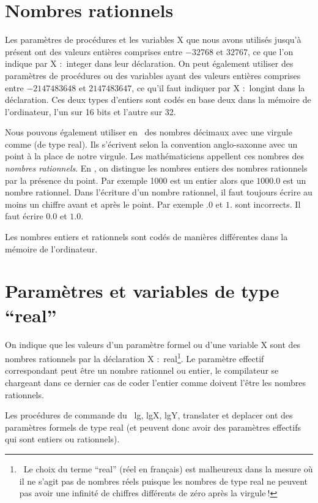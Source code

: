 \section{Nombres rationnels}
Les paramètres de procédures et les variables {\idt X} que nous avons utilisés jusqu'à 
présent ont des valeurs entières comprises entre $-32768$ et $32767$, ce que l'on indique 
par {\idt X $:$ integer} dans leur déclaration. On peut également utiliser des paramètres de 
procédures ou des variables ayant des valeurs entières comprises entre 
$-2 147 483 648$ et $2 147 483 647$, ce qu'il faut indiquer par {\idt X $:$ longint} dans la 
déclaration. Ces deux types d'entiers sont codés en base deux dans la mémoire de l'ordinateur, 
l'un sur 16 bits et l'autre sur 32.

Nous pouvons également utiliser en \pascal\ des nombres décimaux avec une virgule comme {} (de type {\idt real}). Ils
s'écrivent selon la convention anglo-saxonne  avec un point à la place de notre 
virgule. Les mathématiciens appellent ces nombres des {\em nombres rationnels}. En \pascal, on
distingue les nombres entiers des nombres rationnels par la présence du point. Par exemple
1000 est un entier alors que $1000.0$ est un nombre rationnel. Dans l'écriture d'un nombre 
rationnel, il faut toujours écrire au moins
un chiffre avant et après le point. Par exemple $.0$ et $1.$ sont incorrects. Il faut écrire
$0.0$ et $1.0$.

Les nombres entiers et rationnels sont codés de manières différentes dans la mémoire 
de l'ordinateur. 

\section{Paramètres et variables de type ``real''}
On indique que les valeurs d'un paramètre formel ou d'une variable {\idt X}
sont des nombres rationnels par la déclaration {\idt X $:$ real}\footnote{\ Le choix du terme
``real'' (réel en français) est malheureux dans la mesure où il ne s'agit pas de nombres
réels puisque les nombres de type {\idt real} ne peuvent pas avoir une infinité de chiffres 
différents de zéro après la virgule$\:$!}.  Le paramètre effectif
correspondant peut être un nombre rationnel ou entier, le compilateur se chargeant dans ce
dernier cas de coder l'entier comme doivent l'être les nombres rationnels.

Les procédures de commande du \robot\ {\idt lg}, {\idt lgX}, {\idt lgY},  {\idt translater} et 
{\idt deplacer} ont des paramètres formels de type {\idt real} (et peuvent donc avoir des 
paramètres effectifs qui sont entiers ou rationnels).

